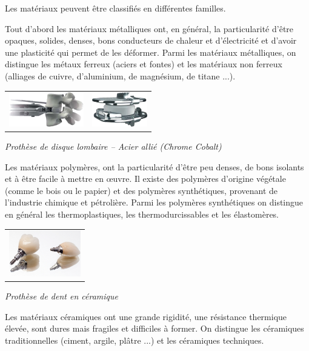 \documentclass[11pt,oneside]{article}
\begin{document}
Les matériaux peuvent être classifiés en différentes familles. 

\begin{minipage}[c]{.6\linewidth}
Tout d'abord les matériaux métalliques ont, en général, la particularité d'être opaques, solides, denses, bons conducteurs de chaleur et d'électricité et d'avoir une plasticité qui permet de les déformer. Parmi les matériaux métalliques, on distingue les métaux ferreux (aciers et fontes) et les matériaux non ferreux (alliages de cuivre, d'aluminium, de magnésium, de titane ...).
\end{minipage} \hfill
\begin{minipage}[c]{.35\linewidth}
\begin{center}
\begin{tabular}{cc}
\includegraphics[height=1.5cm]{png/mobidisc1}&
\includegraphics[height=1.5cm]{png/mobidisc2}
\\
\end{tabular}
\textit{Prothèse de disque lombaire -- Acier allié (Chrome Cobalt) \cite{ldr}}
\end{center}
\end{minipage}

\vspace{.5cm}

Les matériaux polymères, ont la particularité d'être peu denses, de bons isolants et à être facile à mettre en \oe{}uvre. Il existe des polymères d'origine végétale (comme le bois ou le papier) et des polymères synthétiques, provenant de l'industrie chimique et pétrolière. Parmi les polymères synthétiques on distingue en général les thermoplastiques, les thermodurcissables et les élastomères. 


\begin{minipage}[c]{.3\linewidth}
\begin{center}
\begin{tabular}{c}
\includegraphics[height=2cm]{png/dent}
\\
\end{tabular}

\textit{Prothèse de dent en céramique \cite{dent}}
\end{center}
\end{minipage}\hfill
\begin{minipage}[c]{.65\linewidth}
Les matériaux céramiques ont une grande rigidité, une résistance thermique élevée, sont dures mais fragiles et difficiles à former. On distingue les céramiques traditionnelles (ciment, argile, plâtre ...) et les céramiques techniques.
\end{minipage}
\end{document}
